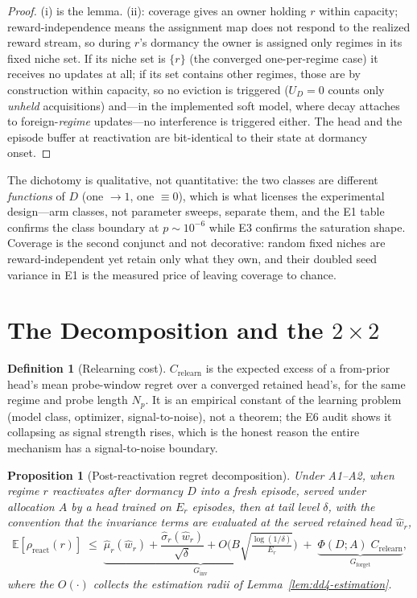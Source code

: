 \documentclass[11pt,a4paper]{article}
\theoremstyle{definition}
\newtheorem{definition}{Definition}[section]
\theoremstyle{plain}
\newtheorem{proposition}{Proposition}[section]
\newcommand{\E}{\mathbb{E}}
\newcommand{\Ginv}{G_{\mathrm{inv}}}
\newcommand{\Gforget}{G_{\mathrm{forget}}}
\begin{document}
\begin{proof}
(i) is the lemma. (ii): coverage gives an owner holding $r$ within
capacity; reward-independence means the assignment map does not respond
to the realized reward stream, so during $r$'s dormancy the owner is
assigned only regimes in its fixed niche set. If its niche set is
$\{r\}$ (the converged one-per-regime case) it receives no updates at
all; if its set contains other regimes, those are by construction
within capacity, so no eviction is triggered ($U_D = 0$ counts only
\emph{unheld} acquisitions) and---in the implemented soft model, where
decay attaches to foreign-\emph{regime} updates---no interference is
triggered either. The head and the episode buffer at reactivation are
bit-identical to their state at dormancy onset.
\end{proof}

\begin{keypoint}
The dichotomy is qualitative, not quantitative: the two classes are
different \emph{functions} of $D$ (one $\to 1$, one $\equiv 0$), which
is what licenses the experimental design---arm classes, not parameter
sweeps, separate them, and the E1 table confirms the class boundary at
$p \sim 10^{-6}$ while E3 confirms the saturation shape. Coverage is the
second conjunct and not decorative: random fixed niches are
reward-independent yet retain only what they own, and their doubled seed
variance in E1 is the measured price of leaving coverage to chance.
\end{keypoint}

\section{The Decomposition and the $2{\times}2$}
\label{sec:dd4-decomp}

\begin{definition}[Relearning cost]
\label{def:dd4-crelearn}
$C_{\mathrm{relearn}}$ is the expected excess of a from-prior head's
mean probe-window regret over a converged retained head's, for the same
regime and probe length $N_p$. It is an empirical constant of the
learning problem (model class, optimizer, signal-to-noise), not a
theorem; the E6 audit shows it collapsing as signal strength rises,
which is the honest reason the entire mechanism has a signal-to-noise
boundary.
\end{definition}

\begin{proposition}[Post-reactivation regret decomposition]
\label{prop:dd4-decomp}
Under A1--A2, when regime $r$ reactivates after dormancy $D$ into a
fresh episode, served under allocation $A$ by a head trained on $E_r$
episodes, then at tail level $\delta$, with the convention that the
invariance terms are evaluated at the served retained head $\hat w_r$,
\[
  \E[\rho_{\mathrm{react}}(r)] \;\le\;
  \underbrace{\hat\mu_r(\hat w_r) + \frac{\hat\sigma_r(\hat w_r)}{\sqrt\delta}
  + O\!\Big(B\sqrt{\tfrac{\log(1/\delta)}{E_r}}\Big)}_{\Ginv}
  \;+\;
  \underbrace{\Phi(D; A)\; C_{\mathrm{relearn}}}_{\Gforget},
\]
where the $O(\cdot)$ collects the estimation radii of
Lemma~\ref{lem:dd4-estimation}.
\end{proposition}
\end{document}
